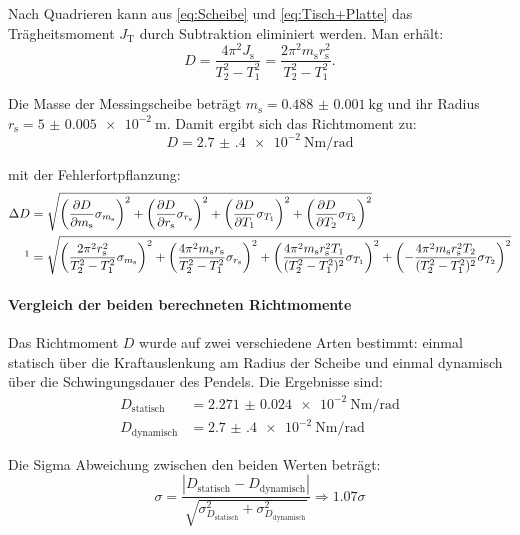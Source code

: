 \documentclass[12pt,a4paper,titlepage]{scrartcl}
\numberwithin{equation}{section}
\numberwithin{table}{section}
\numberwithin{figure}{section}
\begin{document}
Nach Quadrieren kann aus \ref{eq:Scheibe} und \ref{eq:Tisch+Platte} das Trägheitsmoment $J_\text{T}$ durch Subtraktion eliminiert werden. Man erhält: \cite{PAPskript}
\begin{equation}
D = \frac{4\pi^2 J_\text{s}}{T_2^2 - T_1^2} = \frac{2\pi^2 m_\text{s} r_\text{s}^2}{T_2^2 - T_1^2}.
\end{equation}

Die Masse der Messingscheibe beträgt $m_\text{s} = \qty{0.488(1)}{\kilo\gram}$ und ihr Radius \\
$r_\text{s} = \qty{5(0.005)e-2}{\meter}$. Damit ergibt sich das Richtmoment zu:
\begin{equation}
    D = \qty{2.7(4)e-2}{\newton\meter\per\radian}
\end{equation}

mit der Fehlerfortpflanzung:
\begin{align}
    \Delta D &= \sqrt{\left(\frac{\partial D}{\partial m_\text{s}} \sigma_{m_\text{s}}\right)^2 + \left(\frac{\partial D}{\partial r_\text{s}} \sigma_{r_\text{s}}\right)^2 + \left(\frac{\partial D}{\partial T_1} \sigma_{T_1}\right)^2 + \left(\frac{\partial D}{\partial T_2} \sigma_{T_2}\right)^2}\\
    \footnotemark &= \sqrt{\left(\frac{2\pi^2 r_\text{s}^2}{T_2^2 - T_1^2} \sigma_{m_\text{s}}\right)^2 + \left(\frac{4\pi^2 m_\text{s} r_\text{s}}{T_2^2 - T_1^2} \sigma_{r_\text{s}}\right)^2 + \left(\frac{4\pi^2 m_\text{s} r_\text{s}^2 T_1}{(T_2^2 - T_1^2)^2} \sigma_{T_1}\right)^2 + \left(- \frac{4\pi^2 m_\text{s} r_\text{s}^2 T_2}{(T_2^2 - T_1^2)^2} \sigma_{T_2}\right)^2} 
\end{align}


\paragraph{Vergleich der beiden berechneten Richtmomente}
Das Richtmoment $D$ wurde auf zwei verschiedene Arten bestimmt: einmal statisch über die Kraftauslenkung am Radius der Scheibe und einmal dynamisch über die Schwingungsdauer des Pendels. Die Ergebnisse sind:
\begin{align}
    D_\text{statisch} &= \qty{2.271(24)e-2}{\newton\meter\per\radian}\\
    D_\text{dynamisch} &= \qty{2.7(4)e-2}{\newton\meter\per\radian}
\end{align}

Die Sigma Abweichung zwischen den beiden Werten beträgt:
\begin{equation}
    \sigma = \frac{|D_\text{statisch} - D_\text{dynamisch}|}{\sqrt{\sigma_{D_\text{statisch}}^2 + \sigma_{D_\text{dynamisch}}^2}} \Rightarrow 1.07\sigma
\end{equation}
\end{document}
